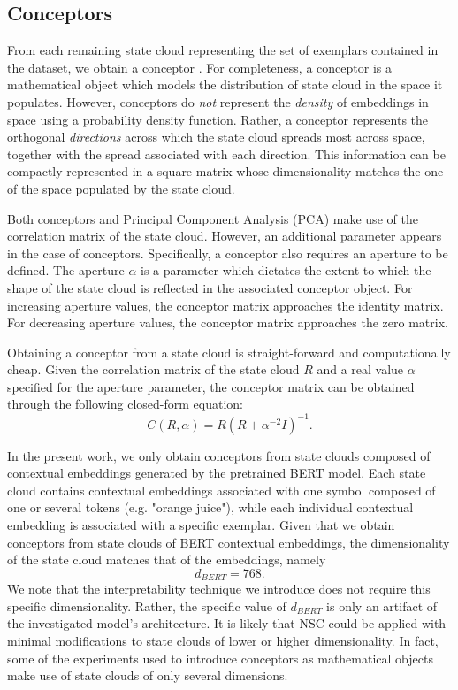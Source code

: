 \subsection{Conceptors}

From each remaining state cloud representing the set of exemplars contained in the dataset, we obtain a conceptor \citep{jaeger_controlling_2017}. For completeness, a conceptor is a mathematical object which models the distribution of state cloud in the space it populates. However, conceptors do \textit{not} represent the \textit{density} of embeddings in space using a probability density function. Rather, a conceptor represents the orthogonal \textit{directions} across which the state cloud spreads most across space, together with the spread associated with each direction. This information can be compactly represented in a square matrix whose dimensionality matches the one of the space populated by the state cloud.

Both conceptors and Principal Component Analysis (PCA) make use of the correlation matrix of the state cloud. However, an additional parameter appears in the case of conceptors. Specifically, a conceptor also requires an aperture to be defined. The aperture $\alpha$ is a parameter which dictates the extent to which the shape of the state cloud is reflected in the associated conceptor object. For increasing aperture values, the conceptor matrix approaches the identity matrix. For decreasing aperture values, the conceptor matrix approaches the zero matrix.

Obtaining a conceptor from a state cloud is straight-forward and computationally cheap. Given the correlation matrix of the state cloud $R$ and a real value $\alpha$ specified for the aperture parameter, the conceptor matrix can be obtained through the following closed-form equation:$$C(R, \alpha) = R (R + \alpha^{-2} I)^{-1}.$$

In the present work, we only obtain conceptors from state clouds composed of contextual embeddings generated by the pretrained BERT model. Each state cloud contains contextual embeddings associated with one symbol composed of one or several tokens (e.g. "orange juice"), while each individual contextual embedding is associated with a specific exemplar. Given that we obtain conceptors from state clouds of BERT contextual embeddings, the dimensionality of the state cloud matches that of the embeddings, namely $$d_{BERT}=768.$$ We note that the interpretability technique we introduce does not require this specific dimensionality. Rather, the specific value of $d_{BERT}$ is only an artifact of the investigated model's architecture. It is likely that NSC could be applied with minimal modifications to state clouds of lower or higher dimensionality. In fact, some of the experiments used to introduce conceptors as mathematical objects make use of state clouds of only several dimensions.

